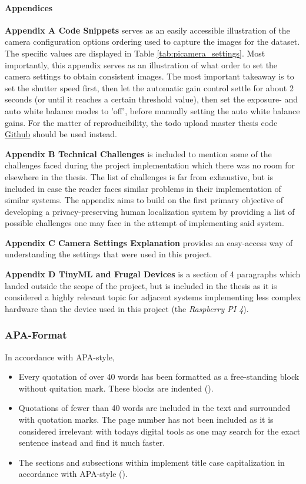 \paragraph{Appendices}
\textbf{Appendix A Code Snippets} serves as an easily accessible illustration of the camera configuration options ordering used to capture the images for the dataset. The specific values are displayed in Table \ref{tab:picamera_settings}. Most importantly, this appendix serves as an illustration of what order to set the camera settings to obtain consistent images. The most important takeaway is to set the shutter speed first, then let the automatic gain control settle for about 2 seconds (or until it reaches a certain threshold value), then set the exposure- and auto white balance modes to 'off', before manually setting the auto white balance gains. For the matter of reproducibility, the todo upload master thesis code \href{https//github.com/hallvaeb/}{Github} should be used instead.

\textbf{Appendix B Technical Challenges} is included to mention some of the challenges faced during the project implementation which there was no room for elsewhere in the thesis. The list of challenges is far from exhaustive, but is included in case the reader faces similar problems in their implementation of similar systems. The appendix aims to build on the first primary objective of developing a privacy-preserving human localization system by providing a list of possible challenges one may face in the attempt of implementing said system.

\textbf{Appendix C Camera Settings Explanation} provides an easy-access way of understanding the settings that were used in this project. 

\textbf{Appendix D TinyML and Frugal Devices} is a section of 4 paragraphs which landed outside the scope of the project, but is included in the thesis as it is considered a highly relevant topic for adjacent systems implementing less complex hardware than the device used in this project (the \textit{Raspberry PI 4}). 

\subsubsection{APA-Format}
In accordance with APA-style, 
\begin{itemize}
	\item Every quotation of over 40 words has been formatted as a free-standing block without quitation mark. These blocks are indented (\cite{UCR2024}). 
	\item Quotations of fewer than 40 words are included in the text and surrounded with quotation marks. The page number has not been included as it is considered irrelevant with todays digital tools as one may search for the exact sentence instead and find it much faster.
	\item The sections and subsections within implement title case capitalization in accordance with APA-style (\cite{apa_title_case}). 
\end{itemize}

